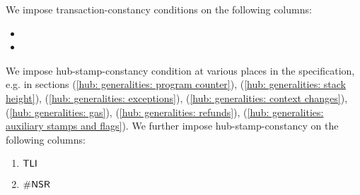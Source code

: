 \noindent We impose transaction-constancy conditions on the following columns:
\begin{multicols}{2}
	\begin{itemize}
		\item \relativeBlockNumber{}
		\item[\vspace{\fill}]
	\end{itemize}
\end{multicols}

\noindent We impose hub-stamp-constancy condition at various places in the specification, e.g. in sections
(\ref{hub: generalities: program counter}),
(\ref{hub: generalities: stack height}),
(\ref{hub: generalities: exceptions}),
(\ref{hub: generalities: context changes}),
(\ref{hub: generalities: gas}),
(\ref{hub: generalities: refunds}),
(\ref{hub: generalities: auxiliary stamps and flags}).
We further impose hub-stamp-constancy on the following columns:
\begin{multicols}{2}
	\begin{enumerate}
		\item $\textsf{TLI}$
		\item $\textsf{\#NSR}$
	\end{enumerate}
\end{multicols}
